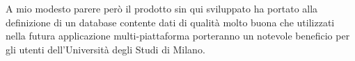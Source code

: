 \documentclass[12pt]{report}
\begin{document}
\vspace{5mm} %

A mio modesto parere però il prodotto sin qui sviluppato ha portato alla definizione di un database contente dati di qualità molto buona che utilizzati nella futura applicazione multi-piattaforma porteranno un notevole beneficio per gli utenti dell'Università degli Studi di Milano.   
%
%

%
%
\nocite{*}
\printbibliography

% 
\end{document}
